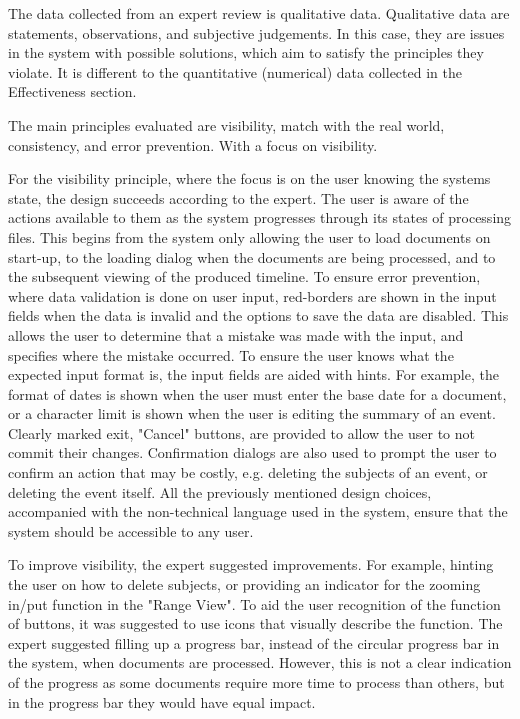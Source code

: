 \par The data collected from an expert review is qualitative data. Qualitative data are statements, observations, and subjective judgements. In this case, they are issues in the system with possible solutions, which aim to satisfy the principles they violate. It is different to the quantitative (numerical) data collected in the Effectiveness section.

\par The main principles evaluated are visibility, match with the real world, consistency, and error prevention. With a focus on visibility.

\par For the visibility principle, where the focus is on the user knowing the systems state, the design succeeds according to the expert. The user is aware of the actions available to them as the system progresses through its states of processing files. This begins from the system only allowing the user to load documents on start-up, to the loading dialog when the documents are being processed, and to the subsequent viewing of the produced timeline. To ensure error prevention, where data validation is done on user input, red-borders are shown in the input fields when the data is invalid and the options to save the data are disabled. This allows the user to determine that a mistake was made with the input, and specifies where the mistake occurred. To ensure the user knows what the expected input format is, the input fields are aided with hints. For example, the format of dates is shown when the user must enter the base date for a document, or a character limit is shown when the user is editing the summary of an event. Clearly marked exit, "Cancel" buttons, are provided to allow the user to not commit their changes. Confirmation dialogs are also used to prompt the user to confirm an action that may be costly, e.g. deleting the subjects of an event, or deleting the event itself. All the previously mentioned design choices, accompanied with the non-technical language used in the system, ensure that the system should be accessible to any user.

\par To improve visibility, the expert suggested improvements. For example, hinting the user on how to delete subjects, or providing an indicator for the zooming in/put function in the "Range View". To aid the user recognition of the function of buttons, it was suggested to use icons that visually describe the function. The expert suggested filling up a progress bar, instead of the circular progress bar in the system, when documents are processed. However, this is not a clear indication of the progress as some documents require more time to process than others, but in the progress bar they would have equal impact.

